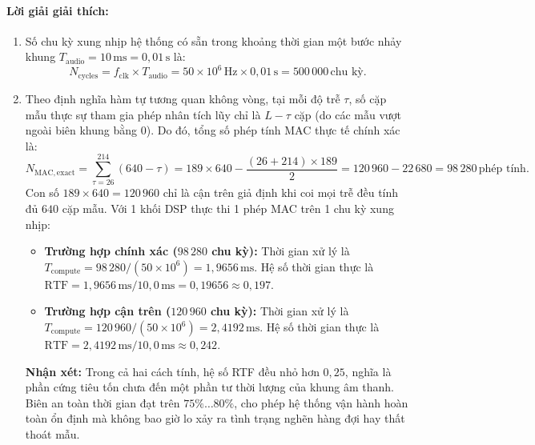 \paragraph{Lời giải giải thích:}
\begin{enumerate}[label=\alph*)]
    \item Số chu kỳ xung nhịp hệ thống có sẵn trong khoảng thời gian một bước nhảy khung $T_{\mathrm{audio}} = 10\,\text{ms} = 0{,}01\,\text{s}$ là:
    \[
    N_{\mathrm{cycles}} = f_{\mathrm{clk}} \times T_{\mathrm{audio}} = 50 \times 10^6\,\text{Hz} \times 0{,}01\,\text{s} = 500\,000\,\text{chu kỳ}.
    \]
    \item Theo định nghĩa hàm tự tương quan không vòng, tại mỗi độ trễ $\tau$, số cặp mẫu thực sự tham gia phép nhân tích lũy chỉ là $L - \tau$ cặp (do các mẫu vượt ngoài biên khung bằng 0). Do đó, tổng số phép tính MAC thực tế chính xác là:
    \[
    N_{\mathrm{MAC,exact}} = \sum_{\tau=26}^{214} (640 - \tau) = 189 \times 640 - \frac{(26 + 214) \times 189}{2} = 120\,960 - 22\,680 = 98\,280\,\text{phép tính}.
    \]
    Con số $189 \times 640 = 120\,960$ chỉ là cận trên giả định khi coi mọi trễ đều tính đủ $640$ cặp mẫu.
    Với 1 khối DSP thực thi 1 phép MAC trên 1 chu kỳ xung nhịp:
    \begin{itemize}[leftmargin=1.2em]
        \item \textbf{Trường hợp chính xác ($98\,280$ chu kỳ):} Thời gian xử lý là $T_{\mathrm{compute}} = 98\,280 / (50 \times 10^6) = 1{,}9656\,\text{ms}$. Hệ số thời gian thực là $\text{RTF} = 1{,}9656\,\text{ms} / 10{,}0\,\text{ms} = 0{,}19656 \approx 0{,}197$.
        \item \textbf{Trường hợp cận trên ($120\,960$ chu kỳ):} Thời gian xử lý là $T_{\mathrm{compute}} = 120\,960 / (50 \times 10^6) = 2{,}4192\,\text{ms}$. Hệ số thời gian thực là $\text{RTF} = 2{,}4192\,\text{ms} / 10{,}0\,\text{ms} \approx 0{,}242$.
    \end{itemize}
    \textbf{Nhận xét:} Trong cả hai cách tính, hệ số RTF đều nhỏ hơn $0{,}25$, nghĩa là phần cứng tiêu tốn chưa đến một phần tư thời lượng của khung âm thanh. Biên an toàn thời gian đạt trên $75\% \ldots 80\%$, cho phép hệ thống vận hành hoàn toàn ổn định mà không bao giờ lo xảy ra tình trạng nghẽn hàng đợi hay thất thoát mẫu.
\end{enumerate}

